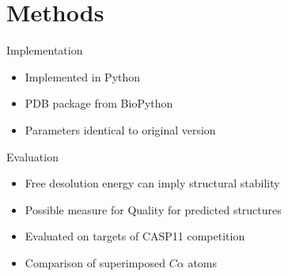 \section{Methods}

\begin{frame}{Implementation}
    \begin{itemize}
        \item Implemented in Python
        \item PDB package from BioPython
        \item Parameters identical to original version
    \end{itemize}
\end{frame}

\begin{frame}{Evaluation}
    \begin{itemize}
        \item Free desolution energy can imply structural stability
        \item Possible measure for Quality for predicted structures
        \item Evaluated on targets of CASP11 competition
        \item Comparison of superimposed $C\alpha$ atoms
    \end{itemize}
\end{frame}
